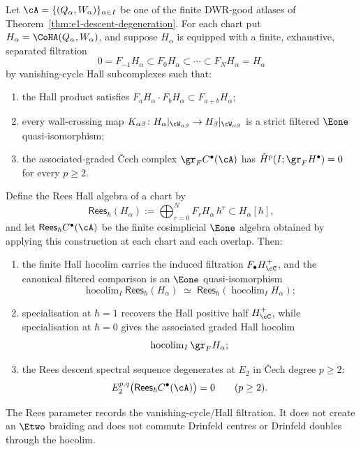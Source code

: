 \begin{proposition}
\label{prop:finite-rees-hall-descent}
Let $\cA=\{(Q_\alpha,W_\alpha)\}_{\alpha\in I}$ be one of the finite
DWR-good atlases of Theorem~\ref{thm:e1-descent-degeneration}. For each
chart put \(H_\alpha=\CoHA(Q_\alpha,W_\alpha)\), and suppose \(H_\alpha\)
is equipped with a finite, exhaustive, separated filtration
\[
 0=F_{-1}H_\alpha\subset F_0H_\alpha\subset\cdots\subset F_NH_\alpha
 =H_\alpha
\]
by vanishing-cycle Hall subcomplexes such that:
\begin{enumerate}[label=\textup{(R\arabic*)}]
 \item the Hall product satisfies
 \(F_aH_\alpha\cdot F_bH_\alpha\subset F_{a+b}H_\alpha\);
 \item every wall-crossing map
 \(K_{\alpha\beta}\colon H_\alpha|_{\cW_{\alpha\beta}}
 \to H_\beta|_{\cW_{\alpha\beta}}\) is a strict filtered
 $\Eone$ quasi-isomorphism;
 \item the associated-graded \v{C}ech complex
 \(\gr_F C^\bullet(\cA)\) has
 \(\check{H}^p(I;\gr_F H^\bullet)=0\) for every \(p\geq2\).
\end{enumerate}
Define the Rees Hall algebra of a chart by
\[
 \mathsf{Rees}_\hbar(H_\alpha)
 :=\bigoplus_{r=0}^{N} F_rH_\alpha\,\hbar^r
 \subset H_\alpha[\hbar],
\]
and let \(\mathsf{Rees}_\hbar C^\bullet(\cA)\) be the finite
cosimplicial $\Eone$ algebra obtained by applying this construction at
each chart and each overlap. Then:
\begin{enumerate}[label=\textup{(\roman*)}]
 \item the finite Hall hocolim carries the induced filtration
 \(F_\bullet H^+_\cC\), and the canonical filtered comparison is an
 $\Eone$ quasi-isomorphism
 \[
  \operatorname{hocolim}_{I}\mathsf{Rees}_\hbar(H_\alpha)
  \;\simeq\;
  \mathsf{Rees}_\hbar\!\left(\operatorname{hocolim}_{I}H_\alpha\right);
 \]
 \item specialisation at \(\hbar=1\) recovers the Hall positive half
 \(H^+_\cC\), while specialisation at \(\hbar=0\) gives the associated
 graded Hall hocolim
 \[
  \operatorname{hocolim}_{I}\gr_F H_\alpha;
 \]
 \item the Rees descent spectral sequence degenerates at \(E_2\) in
 \v{C}ech degree \(p\geq2\):
 \[
  E_2^{p,q}\bigl(\mathsf{Rees}_\hbar C^\bullet(\cA)\bigr)=0
  \qquad (p\geq2).
 \]
\end{enumerate}
The Rees parameter records the vanishing-cycle/Hall filtration. It does
not create an $\Etwo$ braiding and does not commute Drinfeld centres or
Drinfeld doubles through the hocolim.
\end{proposition}

